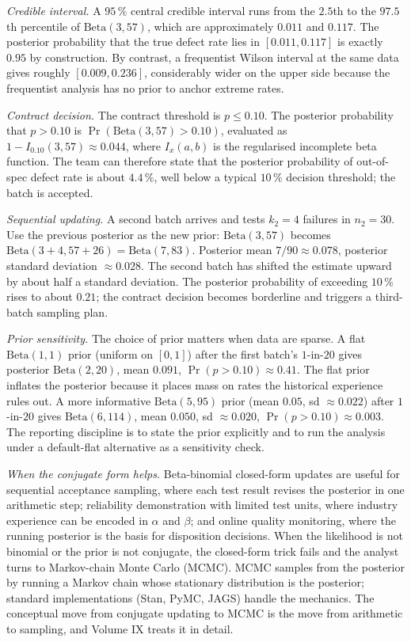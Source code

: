 \textit{Credible interval.} A $95 \,\%$ central credible interval
runs from the $2.5$th to the $97.5$th percentile of
$\text{Beta}(3, 57)$, which are approximately $0.011$ and $0.117$.
The posterior probability that the true defect rate lies in
$[0.011, 0.117]$ is exactly $0.95$ by construction. By contrast,
a frequentist Wilson interval at the same data gives roughly
$[0.009, 0.236]$, considerably wider on the upper side because the
frequentist analysis has no prior to anchor extreme rates.

\textit{Contract decision.} The contract threshold is
$p \leq 0.10$. The posterior probability that $p > 0.10$ is
$\Pr(\text{Beta}(3, 57) > 0.10)$, evaluated as
$1 - I_{0.10}(3, 57) \approx 0.044$, where $I_{x}(a, b)$ is the
regularised incomplete beta function. The team can therefore
state that the posterior probability of out-of-spec defect rate is
about $4.4 \,\%$, well below a typical $10 \,\%$ decision
threshold; the batch is accepted.

\textit{Sequential updating.} A second batch arrives and tests
$k_{2} = 4$ failures in $n_{2} = 30$. Use the previous posterior
as the new prior: $\text{Beta}(3, 57)$ becomes
$\text{Beta}(3 + 4, 57 + 26) = \text{Beta}(7, 83)$. Posterior mean
$7/90 \approx 0.078$, posterior standard deviation $\approx
0.028$. The second batch has shifted the estimate upward by about
half a standard deviation. The posterior probability of exceeding
$10 \,\%$ rises to about $0.21$; the contract decision becomes
borderline and triggers a third-batch sampling plan.

\textit{Prior sensitivity.} The choice of prior matters when data
are sparse. A flat $\text{Beta}(1, 1)$ prior (uniform on $[0, 1]$)
after the first batch's $1$-in-$20$ gives posterior $\text{Beta}(2,
20)$, mean $0.091$, $\Pr(p > 0.10) \approx 0.41$. The flat prior
inflates the posterior because it places mass on rates the
historical experience rules out. A more informative
$\text{Beta}(5, 95)$ prior (mean $0.05$, sd $\approx 0.022$)
after $1$-in-$20$ gives $\text{Beta}(6, 114)$, mean $0.050$, sd
$\approx 0.020$, $\Pr(p > 0.10) \approx 0.003$. The reporting
discipline is to state the prior explicitly and to run the
analysis under a default-flat alternative as a sensitivity check.

\textit{When the conjugate form helps.} Beta-binomial closed-form
updates are useful for sequential acceptance sampling, where each
test result revises the posterior in one arithmetic step;
reliability demonstration with limited test units, where industry
experience can be encoded in $\alpha$ and $\beta$; and online
quality monitoring, where the running posterior is the basis for
disposition decisions. When the likelihood is not binomial or the
prior is not conjugate, the closed-form trick fails and the
analyst turns to Markov-chain Monte Carlo (MCMC). MCMC samples
from the posterior by running a Markov chain whose stationary
distribution is the posterior; standard implementations
(\textsf{Stan}, \textsf{PyMC}, \textsf{JAGS}) handle the
mechanics. The conceptual move from conjugate updating to MCMC is
the move from arithmetic to sampling, and Volume IX treats it in
detail.

